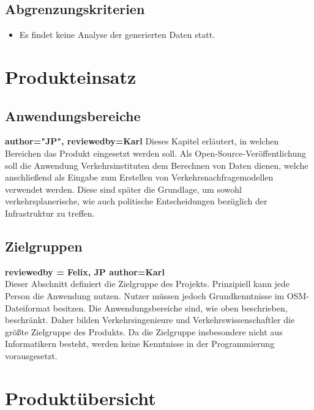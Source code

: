 \documentclass[parskip=full]{scrartcl} %
\begin{document}
\subsection{Abgrenzungskriterien}
\begin{itemize}
    \item Es findet keine Analyse der generierten Daten statt.
\end{itemize}
\newpage

\section{Produkteinsatz}

\subsection{Anwendungsbereiche}
\textbf{author="JP", reviewedby=Karl} 
Dieses Kapitel erläutert, in welchen Bereichen das Produkt eingesetzt werden soll. Als Open-Source-Veröffentlichung soll die Anwendung Verkehrsinstituten dem Berechnen von Daten dienen, welche anschließend als Eingabe zum Erstellen von Verkehrsnachfragemodellen verwendet werden. Diese sind später die Grundlage, um sowohl verkehrsplanerische, wie auch politische Entscheidungen bezüglich der Infrastruktur zu treffen.


\subsection{Zielgruppen}
\textbf{reviewedby = Felix, JP author=Karl\\}
Dieser Abschnitt definiert die Zielgruppe des Projekts. Prinzipiell kann jede Person die Anwendung nutzen. Nutzer müssen jedoch Grundkenntnisse im OSM-Dateiformat besitzen. Die Anwendungsbereiche sind, wie oben beschrieben, beschränkt. Daher bilden Verkehrsingenieure und Verkehrswissenschaftler die größte Zielgruppe des Produkts. Da die Zielgruppe insbesondere nicht aus Informatikern besteht, werden keine Kenntnisse in der Programmierung vorausgesetzt.


\newpage







\section{Produktübersicht}
\newpage
\end{document}
